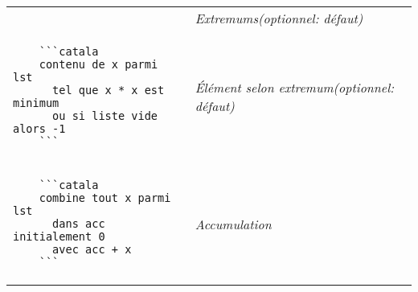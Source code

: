 \documentclass{article}
\makeatletter
\newenvironment{catala}{%
  \VerbatimEnvironment
  \let\FV@ListVSpace\relax
  \begin{verbatim}}%
 {\end{verbatim}}
\makeatother
\begin{document}
\begin{multicols}{3}
\begin{tabular}{@{}p{\cola}>{\slshape}p{\colb}@{}}
  & Extremums\newline (optionnel: défaut)
  \\
  \begin{catala}
    ```catala
    contenu de x parmi lst
      tel que x * x est minimum
      ou si liste vide alors -1
    ```
  \end{catala}
  & Élément selon extremum\newline (optionnel: défaut)
  \\
  \begin{catala}
    ```catala
    combine tout x parmi lst
      dans acc initialement 0
      avec acc + x
    ```
  \end{catala}
  & Accumulation
  \\
\end{tabular}

\end{multicols}
\end{document}
